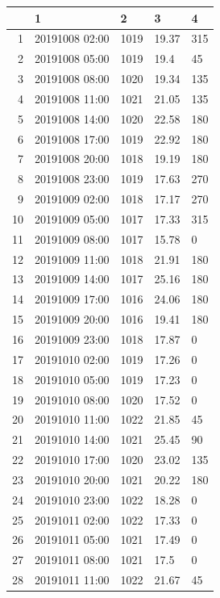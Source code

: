 \documentclass{article}\usepackage[]{graphicx}\usepackage[]{color}
\begin{document}
\newpage

\begin{tabular}{rllll}
  \hline
 & 1 & 2 & 3 & 4 \\ 
  \hline
1 & 20191008 02:00 & 1019 & 19.37 & 315 \\ 
  2 & 20191008 05:00 & 1019 & 19.4 & 45 \\ 
  3 & 20191008 08:00 & 1020 & 19.34 & 135 \\ 
  4 & 20191008 11:00 & 1021 & 21.05 & 135 \\ 
  5 & 20191008 14:00 & 1020 & 22.58 & 180 \\ 
  6 & 20191008 17:00 & 1019 & 22.92 & 180 \\ 
  7 & 20191008 20:00 & 1018 & 19.19 & 180 \\ 
  8 & 20191008 23:00 & 1019 & 17.63 & 270 \\ 
  9 & 20191009 02:00 & 1018 & 17.17 & 270 \\ 
  10 & 20191009 05:00 & 1017 & 17.33 & 315 \\ 
  11 & 20191009 08:00 & 1017 & 15.78 & 0 \\ 
  12 & 20191009 11:00 & 1018 & 21.91 & 180 \\ 
  13 & 20191009 14:00 & 1017 & 25.16 & 180 \\ 
  14 & 20191009 17:00 & 1016 & 24.06 & 180 \\ 
  15 & 20191009 20:00 & 1016 & 19.41 & 180 \\ 
  16 & 20191009 23:00 & 1018 & 17.87 & 0 \\ 
  17 & 20191010 02:00 & 1019 & 17.26 & 0 \\ 
  18 & 20191010 05:00 & 1019 & 17.23 & 0 \\ 
  19 & 20191010 08:00 & 1020 & 17.52 & 0 \\ 
  20 & 20191010 11:00 & 1022 & 21.85 & 45 \\ 
  21 & 20191010 14:00 & 1021 & 25.45 & 90 \\ 
  22 & 20191010 17:00 & 1020 & 23.02 & 135 \\ 
  23 & 20191010 20:00 & 1021 & 20.22 & 180 \\ 
  24 & 20191010 23:00 & 1022 & 18.28 & 0 \\ 
  25 & 20191011 02:00 & 1022 & 17.33 & 0 \\ 
  26 & 20191011 05:00 & 1021 & 17.49 & 0 \\ 
  27 & 20191011 08:00 & 1021 & 17.5 & 0 \\ 
  28 & 20191011 11:00 & 1022 & 21.67 & 45 \\ 

\end{tabular}
\end{document}
